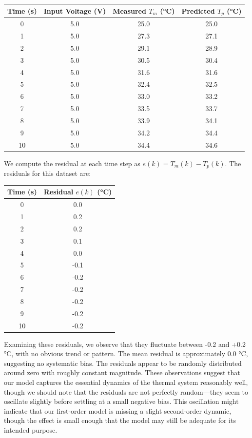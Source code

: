 \begin{center}
\begin{tabular}{c|c|c|c}
Time (s) & Input Voltage (V) & Measured $T_m$ (°C) & Predicted $T_p$ (°C) \\ \hline
0 & 5.0 & 25.0 & 25.0 \\
1 & 5.0 & 27.3 & 27.1 \\
2 & 5.0 & 29.1 & 28.9 \\
3 & 5.0 & 30.5 & 30.4 \\
4 & 5.0 & 31.6 & 31.6 \\
5 & 5.0 & 32.4 & 32.5 \\
6 & 5.0 & 33.0 & 33.2 \\
7 & 5.0 & 33.5 & 33.7 \\
8 & 5.0 & 33.9 & 34.1 \\
9 & 5.0 & 34.2 & 34.4 \\
10 & 5.0 & 34.4 & 34.6 \\
\end{tabular}
\end{center}

We compute the residual at each time step as $e(k) = T_m(k) - T_p(k)$. The residuals for this dataset are:

\begin{center}
\begin{tabular}{c|c}
Time (s) & Residual $e(k)$ (°C) \\ \hline
0 & 0.0 \\
1 & 0.2 \\
2 & 0.2 \\
3 & 0.1 \\
4 & 0.0 \\
5 & -0.1 \\
6 & -0.2 \\
7 & -0.2 \\
8 & -0.2 \\
9 & -0.2 \\
10 & -0.2 \\
\end{tabular}
\end{center}

Examining these residuals, we observe that they fluctuate between -0.2 and +0.2 °C, with no obvious trend or pattern. The mean residual is approximately 0.0 °C, suggesting no systematic bias. The residuals appear to be randomly distributed around zero with roughly constant magnitude. These observations suggest that our model captures the essential dynamics of the thermal system reasonably well, though we should note that the residuals are not perfectly random—they seem to oscillate slightly before settling at a small negative bias. This oscillation might indicate that our first-order model is missing a slight second-order dynamic, though the effect is small enough that the model may still be adequate for its intended purpose.

